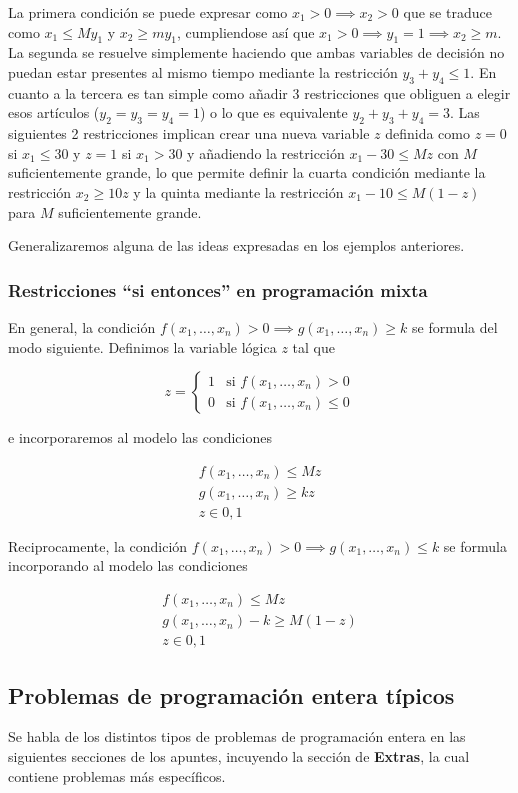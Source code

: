 La primera condición se puede expresar como $x_1 > 0 \implies x_2 > 0$ que se traduce como $x_1\leq My_1$ y $x_2\geq my_1$,
cumpliendose así que $x_1>0\implies y_1=1 \implies x_2\geq m$. La segunda se resuelve simplemente haciendo que ambas variables
de decisión no puedan estar presentes al mismo tiempo mediante la restricción $y_3+y_4\leq 1$. En cuanto a la tercera es tan
simple como añadir 3 restricciones que obliguen a elegir esos artículos ($y_2=y_3=y_4=1$) o lo que es equivalente 
$y_2+y_3+y_4=3$. Las siguientes 2 restricciones implican crear una nueva variable $z$ definida como $z=0$ si $x_1\leq 30$ y
$z=1$ si $x_1>30$ y añadiendo la restricción $x_1-30\leq Mz$ con $M$ suficientemente grande, lo que permite definir la 
cuarta condición mediante la restricción $x_2\geq 10z$ y la quinta mediante la restricción $x_1-10\leq M(1-z)$ para $M$
suficientemente grande.

\vspace*{5mm}

\noindent Generalizaremos alguna de las ideas expresadas en los ejemplos anteriores.

\subsubsection{Restricciones ``si entonces'' en programación mixta}

En general, la condición $f(x_1,\dots,x_n)>0 \implies g(x_1,\dots,x_n)\geq k$ se formula del modo siguiente. 
Definimos la variable lógica $z$ tal que

\[
    z=
    \begin{cases}
        1 & \text{si } f(x_1,\dots,x_n)>0 \\
        0 & \text{si } f(x_1,\dots,x_n)\leq0
    \end{cases}
\]

\noindent e incorporaremos al modelo las condiciones

\[
    \begin{array}{l}
        f(x_1,\dots,x_n)\leq Mz \\
        g(x_1,\dots,x_n)\geq kz \\
        z \in {0, 1}
    \end{array}
\]

\newpage

Reciprocamente, la condición $f(x_1,\dots,x_n)>0 \implies g(x_1,\dots,x_n)\leq k$ se formula incorporando al modelo 
las condiciones

\[
    \begin{array}{l}
        f(x_1,\dots,x_n)\leq Mz \\
        g(x_1,\dots,x_n)-k\geq M(1-z) \\
        z \in {0, 1}
    \end{array}
\]

\subsection{Problemas de programación entera típicos}

Se habla de los distintos tipos de problemas de programación entera en las siguientes secciones de los
apuntes, incuyendo la sección de \textbf{Extras}, la cual contiene problemas más específicos.

